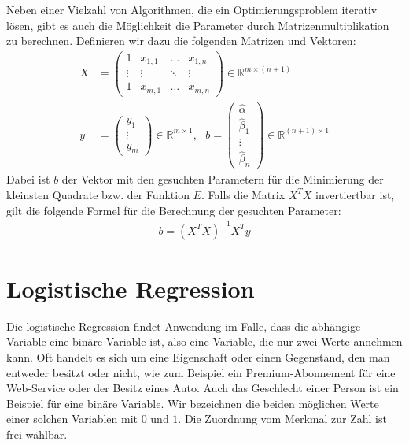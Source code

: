 Neben einer Vielzahl von Algorithmen, die ein Optimierungsproblem iterativ lösen, gibt es auch die Möglichkeit die Parameter durch Matrizenmultiplikation zu berechnen. Definieren wir dazu die folgenden Matrizen und Vektoren:
\begin{align*}
    X &= \begin{pmatrix}
        1 & x_{1, 1} & \dots & x_{1, n} \\
        \vdots & \vdots & \ddots & \vdots \\
        1 & x_{m, 1} & \dots & x_{m, n}
    \end{pmatrix} \in \mathbb{R}^{m \times (n + 1)} \\
    y &= \begin{pmatrix}
        y_1 \\
        \vdots \\
        y_m
    \end{pmatrix} \in \mathbb{R}^{m \times 1}, ~~~
    b = \begin{pmatrix}
        \hat\alpha \\
        \hat\beta_1 \\
        \vdots \\
        \hat\beta_n
    \end{pmatrix} \in \mathbb{R}^{(n + 1) \times 1}
\end{align*}
Dabei ist $b$ der Vektor mit den gesuchten Parametern für die Minimierung der kleinsten Quadrate bzw. der Funktion $E$. Falls die Matrix $X^T X$ invertiertbar ist, gilt die folgende Formel für die Berechnung der gesuchten Parameter:
\begin{align*}
    b = (X^T X)^{-1} X^T y
\end{align*}

\section{Logistische Regression}
\label{section:2:2}

Die logistische Regression findet Anwendung im Falle, dass die abhängige Variable eine binäre Variable ist, also eine Variable, die nur zwei Werte annehmen kann. Oft handelt es sich um eine Eigenschaft oder einen Gegenstand, den man entweder besitzt oder nicht, wie zum Beispiel ein Premium-Abonnement für eine Web-Service oder der Besitz eines Auto. Auch das Geschlecht einer Person ist ein Beispiel für eine binäre Variable. Wir bezeichnen die beiden möglichen Werte einer solchen Variablen mit $0$ und $1$. Die Zuordnung vom Merkmal zur Zahl ist frei wählbar.

